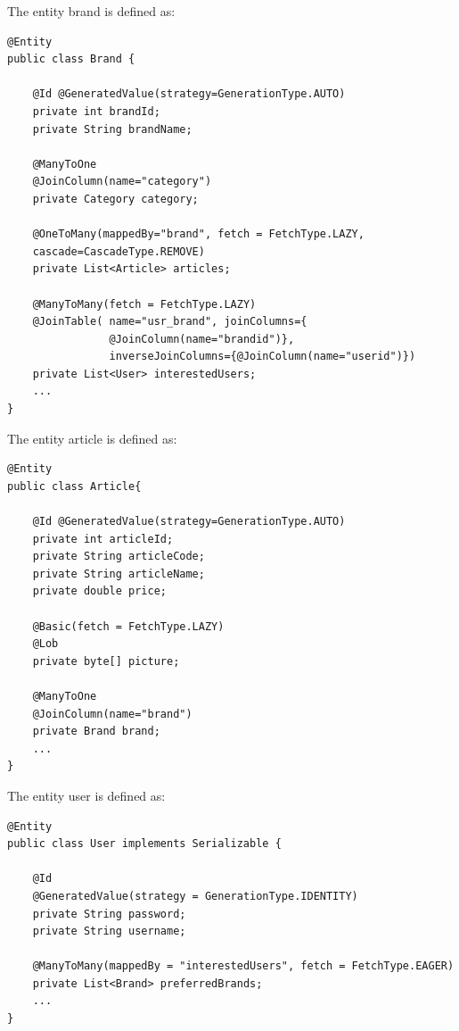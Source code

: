 The entity brand is defined as:  
\begin{lstlisting}[style=Java]
@Entity
public class Brand {

    @Id @GeneratedValue(strategy=GenerationType.AUTO)
    private int brandId;
    private String brandName;

    @ManyToOne
    @JoinColumn(name="category")
    private Category category;

    @OneToMany(mappedBy="brand", fetch = FetchType.LAZY,
    cascade=CascadeType.REMOVE)
    private List<Article> articles;

    @ManyToMany(fetch = FetchType.LAZY)
    @JoinTable( name="usr_brand", joinColumns={
                @JoinColumn(name="brandid")}, 
                inverseJoinColumns={@JoinColumn(name="userid")})
    private List<User> interestedUsers;
    ...
}
\end{lstlisting}
The entity article is defined as:  
\begin{lstlisting}[style=Java]
@Entity
public class Article{

    @Id @GeneratedValue(strategy=GenerationType.AUTO)
    private int articleId;
    private String articleCode;
    private String articleName;
    private double price;

    @Basic(fetch = FetchType.LAZY) 
    @Lob
    private byte[] picture;

    @ManyToOne
    @JoinColumn(name="brand")
    private Brand brand;
    ...
}
\end{lstlisting}
The entity user is defined as:  
\begin{lstlisting}[style=Java]
@Entity
public class User implements Serializable {

    @Id
    @GeneratedValue(strategy = GenerationType.IDENTITY)
    private String password;
    private String username;

    @ManyToMany(mappedBy = "interestedUsers", fetch = FetchType.EAGER)
    private List<Brand> preferredBrands;
    ...
}
\end{lstlisting}